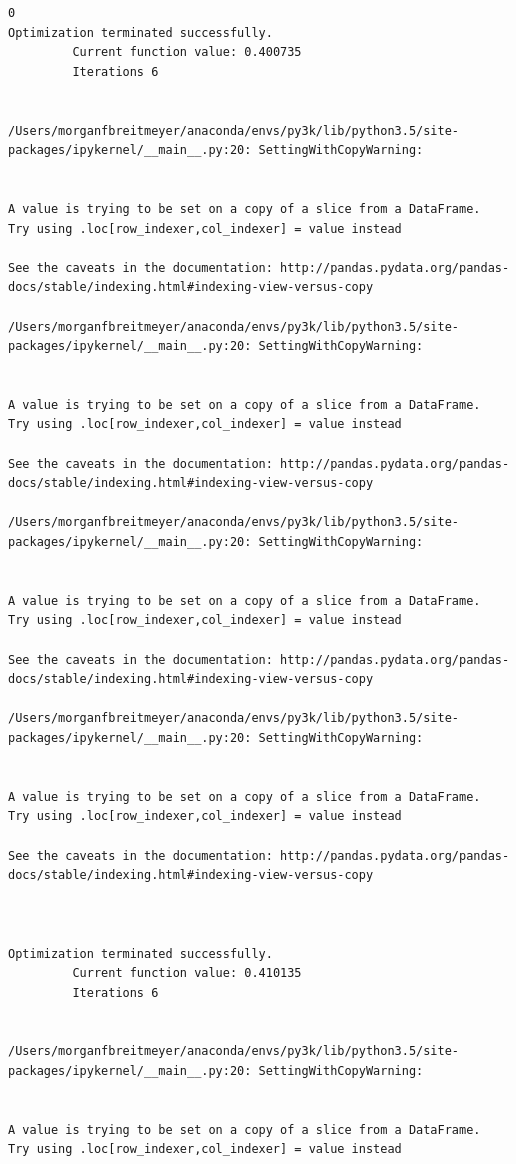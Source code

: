 \begin{lstlisting}
0
Optimization terminated successfully.
         Current function value: 0.400735
         Iterations 6


/Users/morganfbreitmeyer/anaconda/envs/py3k/lib/python3.5/site-packages/ipykernel/__main__.py:20: SettingWithCopyWarning:


A value is trying to be set on a copy of a slice from a DataFrame.
Try using .loc[row_indexer,col_indexer] = value instead

See the caveats in the documentation: http://pandas.pydata.org/pandas-docs/stable/indexing.html#indexing-view-versus-copy

/Users/morganfbreitmeyer/anaconda/envs/py3k/lib/python3.5/site-packages/ipykernel/__main__.py:20: SettingWithCopyWarning:


A value is trying to be set on a copy of a slice from a DataFrame.
Try using .loc[row_indexer,col_indexer] = value instead

See the caveats in the documentation: http://pandas.pydata.org/pandas-docs/stable/indexing.html#indexing-view-versus-copy

/Users/morganfbreitmeyer/anaconda/envs/py3k/lib/python3.5/site-packages/ipykernel/__main__.py:20: SettingWithCopyWarning:


A value is trying to be set on a copy of a slice from a DataFrame.
Try using .loc[row_indexer,col_indexer] = value instead

See the caveats in the documentation: http://pandas.pydata.org/pandas-docs/stable/indexing.html#indexing-view-versus-copy

/Users/morganfbreitmeyer/anaconda/envs/py3k/lib/python3.5/site-packages/ipykernel/__main__.py:20: SettingWithCopyWarning:


A value is trying to be set on a copy of a slice from a DataFrame.
Try using .loc[row_indexer,col_indexer] = value instead

See the caveats in the documentation: http://pandas.pydata.org/pandas-docs/stable/indexing.html#indexing-view-versus-copy



Optimization terminated successfully.
         Current function value: 0.410135
         Iterations 6


/Users/morganfbreitmeyer/anaconda/envs/py3k/lib/python3.5/site-packages/ipykernel/__main__.py:20: SettingWithCopyWarning:


A value is trying to be set on a copy of a slice from a DataFrame.
Try using .loc[row_indexer,col_indexer] = value instead


\end{lstlisting}
